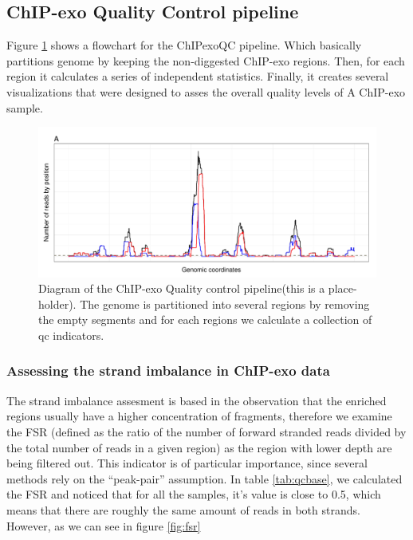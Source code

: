 \documentclass{bmcart}\usepackage[]{graphicx}\usepackage[]{color}
\begin{document}
\subsection{ChIP-exo Quality Control pipeline}
\label{sec:QC}

Figure \ref{fig:qcdiagram} shows a flowchart for the ChIPexoQC
pipeline. Which basically partitions genome by keeping the
non-diggested ChIP-exo regions. Then, for each region it calculates a
series of independent statistics. Finally, it creates several
visualizations that were designed to asses the overall quality levels
of A ChIP-exo sample.

\begin{figure}[h!]
  \centering
  \includegraphics[width = .9\textwidth]{../figs/for_paper/coverage_diagram.pdf}
  \caption{Diagram of the ChIP-exo Quality control pipeline(this is a
    place-holder). The genome is partitioned into several regions by
    removing the empty segments and for each regions we calculate a
    collection of qc indicators.}
  \label{fig:qcdiagram}
\end{figure}



\subsubsection{Assessing the strand imbalance in ChIP-exo data}
\label{sec:strand_imbalance}

The strand imbalance assesment is based in the observation that the
enriched regions usually have a higher concentration of fragments,
therefore we examine the FSR (defined as the ratio of the number of
forward stranded reads divided by the total number of reads in a given
region) as the region with lower depth are being filtered out. This
indicator is of particular importance, since several methods rely on
the ``peak-pair'' assumption. In table \ref{tab:qcbase}, we calculated
the FSR and noticed that for all the samples, it's value is close to
0.5, which means that there are roughly the same amount of reads in
both strands. However, as we can see in figure \ref{fig:fsr}
\end{document}
